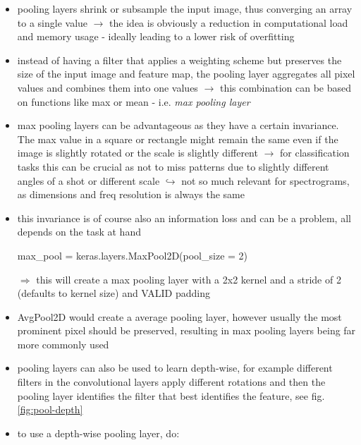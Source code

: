 \documentclass[12pt,a4paper]{article}
\begin{document}
\begin{itemize}
  \item pooling layers shrink or subsample the input image, thus converging an array to a single value
  \newline \indent $\longrightarrow$ the idea is obviously a reduction in computational load and memory usage - ideally leading to a lower risk of overfitting
  \item instead of having a filter that applies a weighting scheme but preserves the size of the input image and feature map, the pooling layer aggregates all pixel values and combines them into one values
  \newline \indent $\longrightarrow$ this combination can be based on functions like max or mean - i.e. \textit{max pooling layer}
  \item max pooling layers can be advantageous as they have a certain invariance. The max value in a square or rectangle might remain the same even if the image is slightly rotated or the scale is slightly different
  \newline \indent $\longrightarrow$ for classification tasks this can be crucial as not to miss patterns due to slightly different angles of a shot or different scale
  \newline \indent $\hookrightarrow$ not so much relevant for spectrograms, as dimensions and freq resolution is always the same
  \item this invariance is of course also an information loss and can be a problem, all depends on the task at hand
  \begin{python}
    max_pool = keras.layers.MaxPool2D(pool_size = 2)
  \end{python}
  $\Longrightarrow$ this will create a max pooling layer with a 2x2 kernel and a stride of 2 (defaults to kernel size) and VALID padding
  \item AvgPool2D would create a average pooling layer, however usually the most prominent pixel should be preserved, resulting in max pooling layers being far more commonly used
  \item pooling layers can also be used to learn depth-wise, for example different filters in the convolutional layers apply different rotations and then the pooling layer identifies the filter that best identifies the feature, see fig. \ref{fig:pool-depth}
  \item to use a depth-wise pooling layer, do:
  \begin{python}

\end{python}
\end{itemize}
\end{document}
